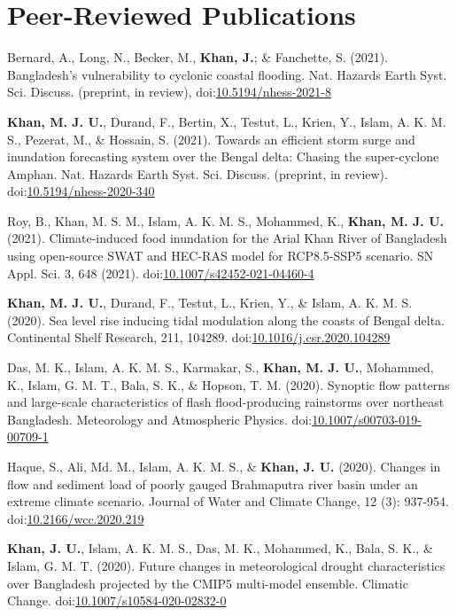 \documentclass[11pt,a4paper,sans]{moderncv}
\begin{document}
\section{Peer-Reviewed Publications}
\begin{hangparas}{1cm}{1}

Bernard, A., Long, N., Becker, M., \textbf{Khan, J.}; \& Fanchette, S. (2021). Bangladesh's vulnerability to cyclonic coastal flooding. Nat. Hazards Earth Syst. Sci. Discuss. (preprint, in review), doi:\href{https://dx.doi.org/10.5194/nhess-2021-8}{10.5194/nhess-2021-8}

\textbf{Khan, M. J. U.}, Durand, F., Bertin, X., Testut, L., Krien, Y., Islam, A. K. M. S., Pezerat, M., \& Hossain, S. (2021). Towards an efficient storm surge and inundation forecasting system over the Bengal delta: Chasing the super-cyclone Amphan. Nat. Hazards Earth Syst. Sci. Discuss. (preprint, in review). doi:\href{https://dx.doi.org/10.5194/nhess-2020-340}{10.5194/nhess-2020-340}

Roy, B., Khan, M. S. M., Islam, A. K. M. S., Mohammed, K., \textbf{Khan, M. J. U.} (2021). Climate-induced food inundation for the Arial Khan River of Bangladesh using open-source SWAT and HEC-RAS model for RCP8.5-SSP5 scenario. SN Appl. Sci. 3, 648 (2021). doi:\href{https://dx.doi.org/10.1007/s42452-021-04460-4}{10.1007/s42452-021-04460-4}
	
\textbf{Khan, M. J. U.}, Durand, F., Testut, L., Krien, Y., \& Islam, A. K. M. S. (2020). Sea level rise inducing tidal modulation along the coasts of Bengal delta. Continental Shelf Research, 211, 104289. doi:\href{https://doi.org/10.1016/j.csr.2020.104289}{10.1016/j.csr.2020.104289}

Das, M. K., Islam, A. K. M. S., Karmakar, S., \textbf{Khan, M. J. U.}, Mohammed, K., Islam, G. M. T., Bala, S. K., \& Hopson, T. M. (2020). Synoptic flow patterns and large-scale characteristics of flash flood-producing rainstorms over northeast Bangladesh. Meteorology and Atmospheric Physics. doi:\href{https://doi.org/10.1007/s00703-019-00709-1}{10.1007/s00703-019-00709-1}

Haque, S., Ali, Md. M., Islam, A. K. M. S., \& \textbf{Khan, J. U.} (2020). Changes in flow and sediment load of poorly gauged Brahmaputra river basin under an extreme climate scenario. Journal of Water and Climate Change, 12 (3): 937-954. doi:\href{https://doi.org/10.2166/wcc.2020.219}{10.2166/wcc.2020.219} 

\textbf{Khan, J. U.}, Islam, A. K. M. S., Das, M. K., Mohammed, K., Bala, S. K., \& Islam, G. M. T. (2020). Future changes in meteorological drought characteristics over Bangladesh projected by the CMIP5 multi-model ensemble. Climatic Change. doi:\href{https://doi.org/10.1007/s10584-020-02832-0}{10.1007/s10584-020-02832-0}


\end{hangparas}
\end{document}
